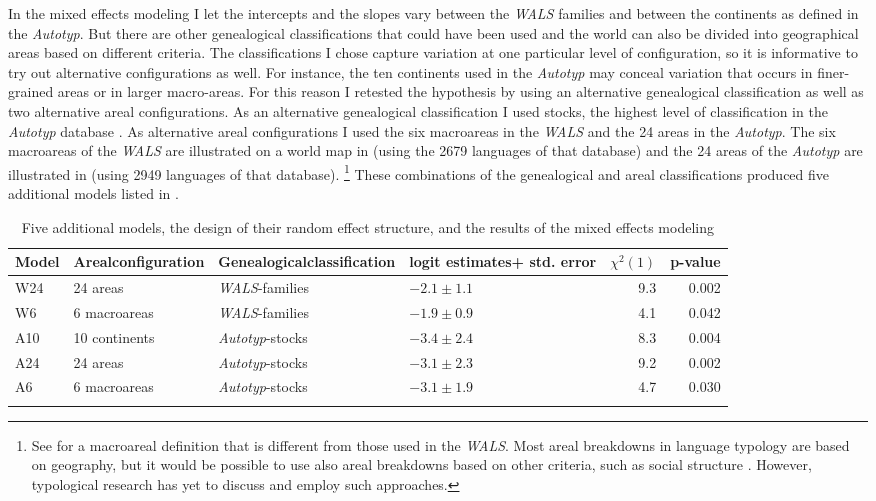 \documentclass[output=collectionpaper]{langsci/langscibook}
\begin{document}
In the mixed effects modeling I let the intercepts and the slopes vary between the \textit{WALS} families and between the continents as defined in the \textit{Autotyp}. But there are other genealogical classifications that could have been used and the world can also be divided into geographical areas based on different criteria. The classifications I chose capture variation at one particular level of configuration, so it is informative to try out alternative configurations as well. For instance, the ten continents used in the \textit{Autotyp} may conceal variation that occurs in finer-grained areas or in larger macro-areas. For this reason I retested the hypothesis by using an alternative genealogical classification as well as two alternative areal configurations. As an alternative genealogical classification I used stocks, the highest level of classification in the \textit{Autotyp} database \citep{Bickel2017}. As alternative areal configurations I used the six macroareas in the \textit{WALS} and the 24 areas in the \textit{Autotyp}. The six macroareas of the \textit{WALS} are illustrated on a world map in  (using the 2679 languages of that database) and the 24 areas of the \textit{Autotyp} are illustrated in  (using 2949 languages of that database).%
\footnote{See \citet{Hammarstroem2014} for a macroareal definition that is different from those used in the \textit{WALS}. Most areal breakdowns in language typology are based on geography, but it would be possible to use also areal breakdowns based on other criteria, such as social structure \citep{Burton1996}. However, typological research has yet to discuss and employ such approaches.} These combinations of the genealogical and areal classifications produced five additional models listed in .

\begin{table}[htb]
\footnotesize
\begin{tabularx}{\textwidth}{lQXQrr}
\lsptoprule
 Model & Areal\linebreak configuration  & Genealogical\linebreak classification & logit estimates\linebreak + std. error &  $\chi^2(1)$ &  p-value\\
\midrule
W24 & 24 areas & \textit{WALS}{}-families & $-2.1 \pm 1.1$ & 9.3 & 0.002\\
W6 & 6 macroareas & \textit{WALS}{}-families & $-1.9 \pm 0.9$ & 4.1 & 0.042\\
A10 & 10 continents & \textit{Autotyp}{}-stocks & $-3.4 \pm 2.4$ & 8.3 & 0.004\\
A24 & 24 areas & \textit{Autotyp}{}-stocks & $-3.1 \pm 2.3$ & 9.2 & 0.002\\
A6 & 6 macroareas & \textit{Autotyp}{}-stocks & $-3.1 \pm 1.9$ & 4.7 & 0.030\\
\lspbottomrule
\end{tabularx}
\caption{Five additional models, the design of their random effect structure, and the results of the mixed effects modeling}
\label{tab:Sinne:4}
\end{table}
\end{document}
